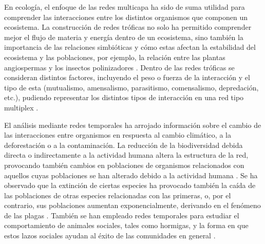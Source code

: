 \documentclass[
]{book}
\begin{document}
En ecología, el enfoque de las redes multicapa ha sido de suma utilidad para comprender las interacciones entre los distintos organismos que componen un ecosistema. La construcción de redes tróficas no solo ha permitido comprender mejor el flujo de materia y energía dentro de un ecosistema, sino también la importancia de las relaciones simbióticas y cómo estas afectan la estabilidad del ecosistema y las poblaciones, por ejemplo, la relación entre las plantas angiospermas y los insectos polinizadores \citep{schleuning2020trait}. Dentro de las redes tróficas se consideran distintos factores, incluyendo el peso o fuerza de la interacción y el tipo de esta (mutualismo, amensalismo, parasitismo, comensalismo, depredación, etc.), pudiendo representar los distintos tipos de interacción en una red tipo multiplex \citep{schweiger2008climate}.

El análisis mediante redes temporales ha arrojado información sobre el cambio de las interacciones entre organismos en respuesta al cambio climático, a la deforestación o a la contaminación. La reducción de la biodiversidad debida directa o indirectamente a la actividad humana altera la estructura de la red, provocando también cambios en poblaciones de organismos relacionados con aquellos cuyas poblaciones se han alterado debido a la actividad humana \citep{schweiger2008climate}. Se ha observado que la extinción de ciertas especies ha provocado también la caída de las poblaciones de otras especies relacionadas con las primeras, o, por el contrario, sus poblaciones aumentan exponencialmente, derivando en el fenómeno de las plagas \citep{ludwig1978qualitative}. También se han empleado redes temporales para estudiar el comportamiento de animales sociales, tales como hormigas, y la forma en que estos lazos sociales ayudan al éxito de las comunidades en general \citep{schleuning2020trait}.
\end{document}
